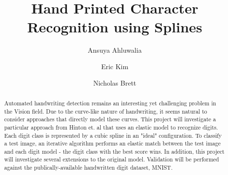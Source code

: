 \documentclass{acmtog} %
\begin{document}

\title{Hand Printed Character Recognition using Splines} %

\author{Ansuya Ahluwalia 
\and
Eric Kim
\and
Nicholas Brett
}

%
%


\maketitle



\begin{abstract}
Automated handwriting detection remains an interesting yet challenging problem in the Vision field. Due to the curve-like nature of handwriting, it seems natural to consider approaches that directly model these curves. This project will investigate a particular approach from Hinton et. al \cite{Hinton92adaptiveelastic} that uses an elastic model to recognize digits. Each digit class is represented by a cubic spline in an "ideal" configuration. To classify a test image, an iterative algorithm performs an elastic match between the test image and each digit model - the digit class with the best score wins. In addition, this project will investigate several extensions to the original model. Validation will be performed against the publically-available handwritten digit dataset, MNIST.
\end{abstract}
\end{document}
